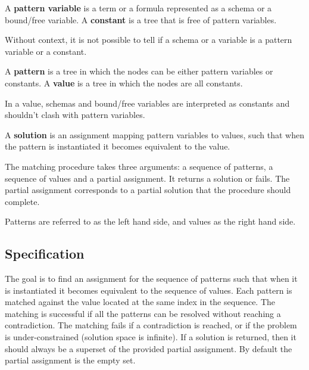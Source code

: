 \begin{definition}
A \textbf{pattern variable} is a term or a formula represented as a schema or a bound/free variable.
A \textbf{constant} is a tree that is free of pattern variables.
\end{definition}

Without context, it is not possible to tell if a schema or a variable is a pattern variable or a constant.

\begin{definition}
A \textbf{pattern} is a tree in which the nodes can be either pattern variables or constants.
A \textbf{value} is a tree in which the nodes are all constants.
\end{definition}

In a value, schemas and bound/free variables are interpreted as constants and shouldn't clash with pattern variables.

\begin{definition}
A \textbf{solution} is an assignment mapping pattern variables to values, such that when the pattern is instantiated it becomes equivalent to the value.
\end{definition}

The matching procedure takes three arguments: a sequence of patterns, a sequence of values and a partial assignment. It returns a solution or fails. The partial assignment corresponds to a partial solution that the procedure should complete.

Patterns are referred to as the left hand side, and values as the right hand side.

\subsection{Specification}

The goal is to find an assignment for the sequence of patterns such that when it is instantiated it becomes equivalent to the sequence of values. Each pattern is matched against the value located at the same index in the sequence. The matching is successful if all the patterns can be resolved without reaching a contradiction. The matching fails if a contradiction is reached, or if the problem is under-constrained (solution space is infinite). If a solution is returned, then it should always be a superset of the provided partial assignment. By default the partial assignment is the empty set.

